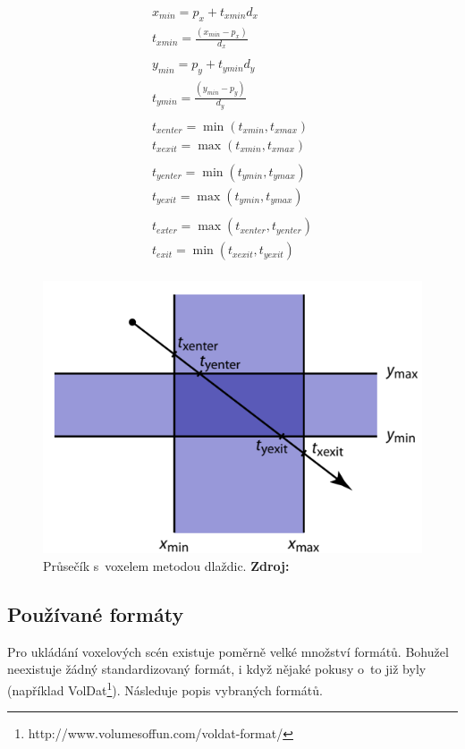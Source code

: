 \begin{equation} \label{eq:slabs}
	\begin{gathered}
		x_{min} = p_x + t_{xmin} d_x\\
		t_{xmin} = \frac{(x_{min} - p_x)}{d_x}\\
		\\
		y_{min} = p_y + t_{ymin} d_y\\
		t_{ymin} = \frac{(y_{min} - p_y)}{d_y}\\
		\\
		t_{xenter} = \min(t_{xmin}, t_{xmax})\\
		t_{xexit} = \max(t_{xmin}, t_{xmax})\\
		\\
		t_{yenter} = \min(t_{ymin}, t_{ymax})\\
		t_{yexit} = \max(t_{ymin}, t_{ymax})\\
		\\
		t_{exter} = \max(t_{xenter}, t_{yenter})\\
		t_{exit} = \min(t_{xexit}, t_{yexit})\\
	\end{gathered}
\end{equation}

\begin{figure}[H]
	\centering
	\includegraphics[scale=1.3]{obrazky-figures/slab_intersect.png}
	\caption{Průsečík s~voxelem metodou dlaždic. \textbf{Zdroj: \cite{Cunha13}}}
	\label{fig:slabs}
\end{figure}


\subsection{Používané formáty} \label{sec:format}
Pro ukládání voxelových scén existuje poměrně velké množství formátů. Bohužel neexistuje žádný standardizovaný formát, i když nějaké pokusy o~to již byly (například VolDat\footnote{http://www.volumesoffun.com/voldat-format/}). Následuje popis vybraných formátů.


